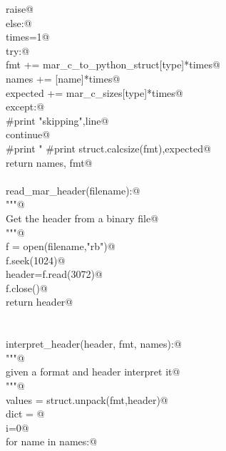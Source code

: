 \documentclass[10pt,a4paper,twoside,notitlepage]{article}
\begin{document}
\begin{flushleft}
\begin{list}{}{}
\mbox{}\verb@                raise@\\
\mbox{}\verb@        else:@\\
\mbox{}\verb@            times=1@\\
\mbox{}\verb@        try:@\\
\mbox{}\verb@            fmt   += mar_c_to_python_struct[type]*times@\\
\mbox{}\verb@            names += [name]*times@\\
\mbox{}\verb@            expected += mar_c_sizes[type]*times@\\
\mbox{}\verb@        except:@\\
\mbox{}\verb@            #print "skipping",line@\\
\mbox{}\verb@            continue@\\
\mbox{}\verb@        #print "%4d %4d"%(mar_c_sizes[type]*times,expected),name,":",times,line@\\
\mbox{}\verb@    #print struct.calcsize(fmt),expected@\\
\mbox{}\verb@    return names, fmt@\\
\mbox{}\verb@@\\
\mbox{}\verb@def read_mar_header(filename):@\\
\mbox{}\verb@    """@\\
\mbox{}\verb@    Get the header from a binary file@\\
\mbox{}\verb@    """@\\
\mbox{}\verb@    f = open(filename,"rb")@\\
\mbox{}\verb@    f.seek(1024)@\\
\mbox{}\verb@    header=f.read(3072)@\\
\mbox{}\verb@    f.close()@\\
\mbox{}\verb@    return header@\\
\mbox{}\verb@@\\
\mbox{}\verb@@\\
\mbox{}\verb@def interpret_header(header, fmt, names):@\\
\mbox{}\verb@    """@\\
\mbox{}\verb@    given a format and header interpret it@\\
\mbox{}\verb@    """@\\
\mbox{}\verb@    values = struct.unpack(fmt,header)@\\
\mbox{}\verb@    dict = {}@\\
\mbox{}\verb@    i=0@\\
\mbox{}\verb@    for name in names:@\\

\end{list}
\end{flushleft}
\end{document}
